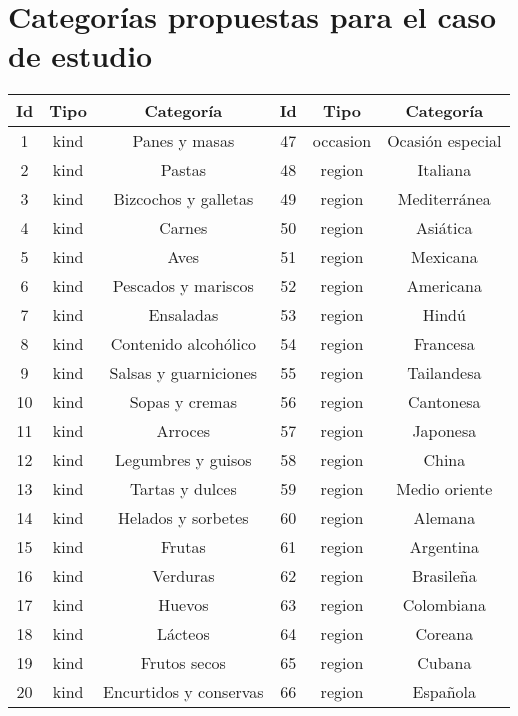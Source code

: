 \section{Categorías propuestas para el caso de estudio}
  \begin{table}[h]
    \begin{center}
      \begin{tabular}{ | c | c | c | c | c | c |}
        \toprule
        Id & Tipo & Categoría & Id & Tipo & Categoría\\
        \midrule
        1 & kind  & Panes y masas & 47 & occasion  & Ocasión especial \\
        \midrule
        2 & kind  & Pastas & 48 & region  & Italiana \\
        \midrule
        3 & kind  & Bizcochos y galletas & 49 & region  & Mediterránea \\
        \midrule
        4 & kind  & Carnes & 50 & region  & Asiática \\
        \midrule
        5 & kind  & Aves & 51 & region  & Mexicana \\
        \midrule
        6 & kind  & Pescados y mariscos & 52 & region  & Americana \\
        \midrule
        7 & kind  & Ensaladas & 53 & region  & Hindú \\
        \midrule
        8 & kind  & Contenido alcohólico & 54 & region  & Francesa \\
        \midrule
        9 & kind  & Salsas y guarniciones & 55 & region  & Tailandesa \\
        \midrule
        10 & kind  & Sopas y cremas & 56 & region  & Cantonesa \\
        \midrule
        11 & kind  & Arroces & 57 & region  & Japonesa \\
        \midrule
        12 & kind  & Legumbres y guisos & 58 & region  & China \\
        \midrule
        13 & kind  & Tartas y dulces & 59 & region  & Medio oriente \\
        \midrule
        14 & kind  & Helados y sorbetes & 60 & region  & Alemana \\
        \midrule
        15 & kind  & Frutas & 61 & region  & Argentina \\
        \midrule
        16 & kind  & Verduras & 62 & region  & Brasileña \\
        \midrule
        17 & kind  & Huevos & 63 & region  & Colombiana \\
        \midrule
        18 & kind  & Lácteos & 64 & region  & Coreana \\
        \midrule
        19 & kind  & Frutos secos & 65 & region  & Cubana \\
        \midrule
        20 & kind  & Encurtidos y conservas & 66 & region  & Española \\
        \bottomrule
      \end{tabular}
    \end{center}
  \end{table}
